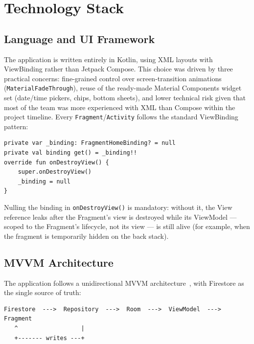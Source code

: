 \section{Technology Stack}

\subsection{Language and UI Framework}

The application is written entirely in Kotlin, using XML layouts with ViewBinding rather than Jetpack Compose. This choice was driven by three practical concerns: fine-grained control over screen-transition animations (\texttt{MaterialFadeThrough}), reuse of the ready-made Material Components widget set (date/time pickers, chips, bottom sheets), and lower technical risk given that most of the team was more experienced with XML than Compose within the project timeline. Every \texttt{Fragment}/\texttt{Activity} follows the standard ViewBinding pattern:

\begin{verbatim}
private var _binding: FragmentHomeBinding? = null
private val binding get() = _binding!!
override fun onDestroyView() {
    super.onDestroyView()
    _binding = null
}
\end{verbatim}

Nulling the binding in \texttt{onDestroyView()} is mandatory: without it, the View reference leaks after the Fragment's view is destroyed while its ViewModel — scoped to the Fragment's lifecycle, not its view — is still alive (for example, when the fragment is temporarily hidden on the back stack).

\subsection{MVVM Architecture}

The application follows a unidirectional MVVM architecture~\cite{android-mvvm}, with Firestore as the single source of truth:

\begin{verbatim}
Firestore  --->  Repository  --->  Room  --->  ViewModel  --->  Fragment
   ^                  |
   +------- writes ---+
\end{verbatim}

